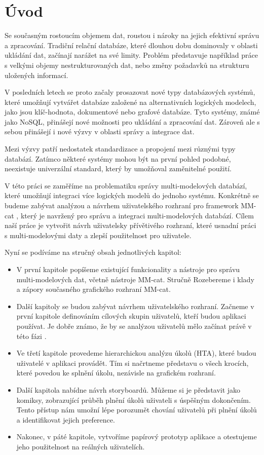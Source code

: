\chapter*{Úvod}

Se současným rostoucím objemem dat, roustou i nároky na jejich efektivní správu a zpracování. Tradiční relační databáze, které dlouhou dobu dominovaly v oblasti ukládání dat, začínají narážet na své limity. Problém představuje například práce s velkými objemy nestrukturovaných dat, nebo změny požadavků na strukturu uložených informací.

V posledních letech se proto začaly prosazovat nové typy databázových systémů, které umožňují vytvářet databáze založené na alternativních logických modelech, jako jsou klíč-hodnota, dokumentové nebo grafové databáze. Tyto systémy, známé jako NoSQL, přinášejí nové možnosti pro ukládání a zpracování dat. Zároveň ale s sebou přinášejí i nové výzvy v oblasti správy a integrace dat.

Mezi výzvy patří nedostatek standardizace a propojení mezi různými typy databází. Zatímco některé systémy mohou být na první pohled podobné, neexistuje univerzální standard, který by umožňoval zaměnitelné použití.

V této práci se zaměříme na problematiku správy multi-modelových databází, které umožňují integraci více logických modelů do jednoho systému. Konkrétně se budeme zabývat analýzou a návrhem uživatelského rozhraní pro framework MM-cat \cite{MM_cat}, který je navržený pro správu a integraci multi-modelových databází. Cílem naší práce je vytvořit návrh uživatelsky přívětivého rozhraní, které usnadní práci s multi-modelovými daty a zlepší použitelnost pro uživatele.

\medskip \medskip

Nyní se podíváme na stručný obsah jednotlivých kapitol:

\begin{itemize}
    \item V první kapitole popíšeme existující funkcionality a nástroje pro správu multi-modelových dat, včetně nástroje MM-cat. Stručně Rozebereme i klady a zápory současného grafického rozhraní MM-cat.
    \item Další kapitoly se budou zabývat návrhem uživatelského rozhraní. Začneme v první kapitole definováním cílových skupin uživatelů, kteří budou aplikaci používat. Je dobře známo, že by se analýzou uživatelů mělo začínat právě v této fázi \cite{Designing_ifaces_2nd_edition}.
    \item Ve třetí kapitole provedeme hierarchickou analýzu úkolů (HTA), které budou uživatelé v aplikaci provádět. Tím si načrtneme představu o všech krocích, které povedou ke splnění úkolu, nezávisle na grafickém rozhraní.
    \item Další kapitola nabídne návrh storyboardů. Můžeme si je představit jako komiksy, zobrazující průběh plnění úkolů uživateli s úspěšným dokončením. Tento přístup nám umožní lépe porozumět chování uživatelů při plnění úkolů a identifikovat jejich preference.
    \item Nakonec, v páté kapitole, vytvoříme papírový prototyp aplikace a otestujeme jeho použitelnost na reálných uživatelích.
\end{itemize}
